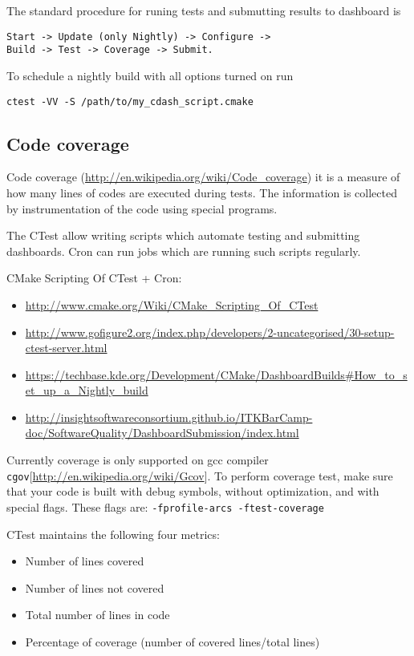 \documentclass[a4paper,10pt]{article}
\begin{document}
The standard procedure for runing tests and submutting results to dashboard is
\begin{verbatim}
Start -> Update (only Nightly) -> Configure -> 
Build -> Test -> Coverage -> Submit.
\end{verbatim}


To schedule a nightly build with all options turned on run 
\begin{verbatim}
ctest -VV -S /path/to/my_cdash_script.cmake
\end{verbatim}

\subsection{Code coverage}

Code coverage (\url{http://en.wikipedia.org/wiki/Code_coverage}) it is a measure of how many lines of codes are executed during tests. The information is collected by instrumentation of the code using special programs.

The CTest allow writing scripts which automate testing and submitting dashboards. Cron can run jobs which are running such scripts regularly.

CMake Scripting Of CTest + Cron:
\begin{itemize}
 \item \url{http://www.cmake.org/Wiki/CMake_Scripting_Of_CTest}
\item\url{http://www.gofigure2.org/index.php/developers/2-uncategorised/30-setup-ctest-server.html}
\item\url{https://techbase.kde.org/Development/CMake/DashboardBuilds#How_to_set_up_a_Nightly_build}
\item\url{http://insightsoftwareconsortium.github.io/ITKBarCamp-doc/SoftwareQuality/DashboardSubmission/index.html}
\end{itemize}

Currently coverage is only supported on gcc compiler \texttt{cgov}[\url{http://en.wikipedia.org/wiki/Gcov}]. To perform coverage test, make sure that your code is built with debug symbols, without optimization, and with special flags. These flags are:
\texttt{-fprofile-arcs -ftest-coverage}

CTest maintains the following four metrics:
\begin{itemize}
\item Number of lines covered
\item Number of lines not covered
\item Total number of lines in code
\item Percentage of coverage (number of covered lines/total lines)
\end{itemize}
\end{document}

